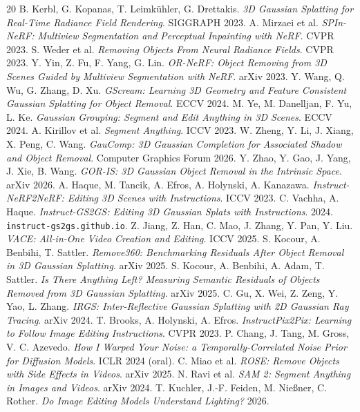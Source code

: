 \documentclass[11pt]{article}
\begin{document}
\begin{thebibliography}{20}
 B. Kerbl, G. Kopanas, T. Leimk\"uhler, G. Drettakis. \emph{3D Gaussian Splatting for Real-Time Radiance Field Rendering}. SIGGRAPH 2023.
 A. Mirzaei et al. \emph{SPIn-NeRF: Multiview Segmentation and Perceptual Inpainting with NeRF}. CVPR 2023.
 S. Weder et al. \emph{Removing Objects From Neural Radiance Fields}. CVPR 2023.
 Y. Yin, Z. Fu, F. Yang, G. Lin. \emph{OR-NeRF: Object Removing from 3D Scenes Guided by Multiview Segmentation with NeRF}. arXiv 2023.
 Y. Wang, Q. Wu, G. Zhang, D. Xu. \emph{GScream: Learning 3D Geometry and Feature Consistent Gaussian Splatting for Object Removal}. ECCV 2024.
 M. Ye, M. Danelljan, F. Yu, L. Ke. \emph{Gaussian Grouping: Segment and Edit Anything in 3D Scenes}. ECCV 2024.
 A. Kirillov et al. \emph{Segment Anything}. ICCV 2023.
 W. Zheng, Y. Li, J. Xiang, X. Peng, C. Wang. \emph{GauComp: 3D Gaussian Completion for Associated Shadow and Object Removal}. Computer Graphics Forum 2026.
 Y. Zhao, Y. Gao, J. Yang, J. Xie, B. Wang. \emph{GOR-IS: 3D Gaussian Object Removal in the Intrinsic Space}. arXiv 2026.
 A. Haque, M. Tancik, A. Efros, A. Holynski, A. Kanazawa. \emph{Instruct-NeRF2NeRF: Editing 3D Scenes with Instructions}. ICCV 2023.
 C. Vachha, A. Haque. \emph{Instruct-GS2GS: Editing 3D Gaussian Splats with Instructions}. 2024. \texttt{instruct-gs2gs.github.io}.
 Z. Jiang, Z. Han, C. Mao, J. Zhang, Y. Pan, Y. Liu. \emph{VACE: All-in-One Video Creation and Editing}. ICCV 2025.
 S. Kocour, A. Benbihi, T. Sattler. \emph{Remove360: Benchmarking Residuals After Object Removal in 3D Gaussian Splatting}. arXiv 2025.
 S. Kocour, A. Benbihi, A. Adam, T. Sattler. \emph{Is There Anything Left? Measuring Semantic Residuals of Objects Removed from 3D Gaussian Splatting}. arXiv 2025.
 C. Gu, X. Wei, Z. Zeng, Y. Yao, L. Zhang. \emph{IRGS: Inter-Reflective Gaussian Splatting with 2D Gaussian Ray Tracing}. arXiv 2024.
 T. Brooks, A. Holynski, A. Efros. \emph{InstructPix2Pix: Learning to Follow Image Editing Instructions}. CVPR 2023.
 P. Chang, J. Tang, M. Gross, V. C. Azevedo. \emph{How I Warped Your Noise: a Temporally-Correlated Noise Prior for Diffusion Models}. ICLR 2024 (oral).
 C. Miao et al. \emph{ROSE: Remove Objects with Side Effects in Videos}. arXiv 2025.
 N. Ravi et al. \emph{SAM 2: Segment Anything in Images and Videos}. arXiv 2024.
 T. Kuchler, J.-F. Feiden, M. Nie{\ss}ner, C. Rother. \emph{Do Image Editing Models Understand Lighting?} 2026.
\end{thebibliography}

\appendix
\end{document}
